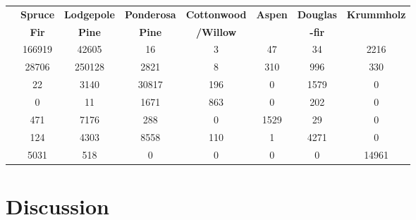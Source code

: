 \documentclass[11pt]{article}
\begin{document}
\begin{center}

\begin{tabular}{|l||c|c|c|c|c|c|c|}
\hline

&\textbf{Spruce} & \textbf{Lodgepole} & \textbf{Ponderosa} & \textbf{Cottonwood} &\textbf{Aspen} & \textbf{Douglas}& \textbf{Krummholz} \\
&\textbf{Fir}&\textbf{Pine}&\textbf{Pine}&\textbf{/Willow}&{}&\textbf{-fir}&{}\\ \hline
&166919 & 42605 & 16 & 3 & 47 & 34 & 2216 \\ \hline
&28706 & 250128 & 2821 & 8 & 310 & 996 & 330 \\ \hline
&22 & 3140 & 30817 & 196 & 0 & 1579 & 0 \\ \hline
&0 & 11 & 1671 & 863 & 0 & 202 & 0 \\ \hline
&471 & 7176 & 288 & 0 & 1529 & 29 & 0 \\ \hline
&124 & 4303 & 8558 & 110 & 1 & 4271 & 0 \\ \hline
&5031 & 518 & 0 & 0 & 0 & 0 & 14961 \\ \hline
\hline %
\end{tabular}

\end{center}

\section{Discussion}
\end{document}
